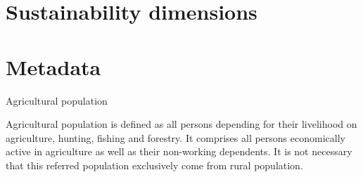 \documentclass[print,Draft]{faosyb}
\begin{document}



\begin{tablepages}
\section{}
\small
  
\clearpage

\end{tablepages}


\part[Sustainability dimensions]{Sustain\-ability dimensions}
\lipsum
\EndPartIntro




\begin{tablepages}
\section{}
\small
  
\clearpage

\end{tablepages}



\part{Metadata}
\EndPartIntro
{}

\begin{metadata}{Agricultural population}

Agricultural population is defined as all persons depending for their livelihood on agriculture, hunting, fishing and forestry. It comprises all persons economically active in agriculture as well as their non-working dependents. It is not necessary that this referred population exclusively come from rural population.
\end{metadata}
\end{document}
